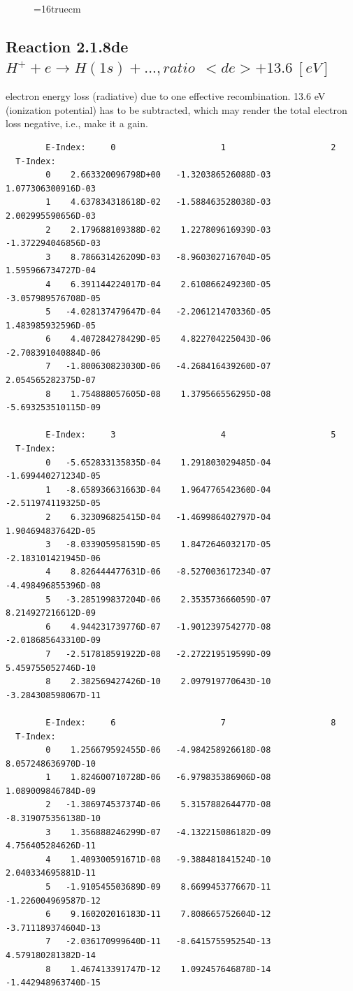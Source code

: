 \documentclass[12pt,dvips]{article}
\begin{document}
\begin{figure} \label{2.1.8rtot}
\epsfxsize=16truecm
\end{figure}
\newpage



\subsection{
  Reaction 2.1.8de $H^+  + e \rightarrow H(1s) + ..., ratio~ \  <de> + 13.6 \ [eV] $
}

  electron energy loss (radiative) due to one effective recombination.
  13.6 eV (ionization potential) has to be
  subtracted, which may render the total electron loss negative, i.e., make it a gain.

\begin{small}\begin{verbatim}
        E-Index:     0                     1                     2
  T-Index:
        0    2.663320096798D+00   -1.320386526088D-03    1.077306300916D-03
        1    4.637834318618D-02   -1.588463528038D-03    2.002995590656D-03
        2    2.179688109388D-02    1.227809616939D-03   -1.372294046856D-03
        3    8.786631426209D-03   -8.960302716704D-05    1.595966734727D-04
        4    6.391144224017D-04    2.610866249230D-05   -3.057989576708D-05
        5   -4.028137479647D-04   -2.206121470336D-05    1.483985932596D-05
        6    4.407284278429D-05    4.822704225043D-06   -2.708391040884D-06
        7   -1.800630823030D-06   -4.268416439260D-07    2.054565282375D-07
        8    1.754888057605D-08    1.379566556295D-08   -5.693253510115D-09

        E-Index:     3                     4                     5
  T-Index:
        0   -5.652833135835D-04    1.291803029485D-04   -1.699440271234D-05
        1   -8.658936631663D-04    1.964776542360D-04   -2.511974119325D-05
        2    6.323096825415D-04   -1.469986402797D-04    1.904694837642D-05
        3   -8.033905958159D-05    1.847264603217D-05   -2.183101421945D-06
        4    8.826444477631D-06   -8.527003617234D-07   -4.498496855396D-08
        5   -3.285199837204D-06    2.353573666059D-07    8.214927216612D-09
        6    4.944231739776D-07   -1.901239754277D-08   -2.018685643310D-09
        7   -2.517818591922D-08   -2.272219519599D-09    5.459755052746D-10
        8    2.382569427426D-10    2.097919770643D-10   -3.284308598067D-11

        E-Index:     6                     7                     8
  T-Index:
        0    1.256679592455D-06   -4.984258926618D-08    8.057248636970D-10
        1    1.824600710728D-06   -6.979835386906D-08    1.089009846784D-09
        2   -1.386974537374D-06    5.315788264477D-08   -8.319075356138D-10
        3    1.356888246299D-07   -4.132215086182D-09    4.756405284626D-11
        4    1.409300591671D-08   -9.388481841524D-10    2.040334695881D-11
        5   -1.910545503689D-09    8.669945377667D-11   -1.226004969587D-12
        6    9.160202016183D-11    7.808665752604D-12   -3.711189374604D-13
        7   -2.036170999640D-11   -8.641575595254D-13    4.579180281382D-14
        8    1.467413391747D-12    1.092457646878D-14   -1.442948963740D-15


\end{verbatim}
\end{small}
\end{document}
